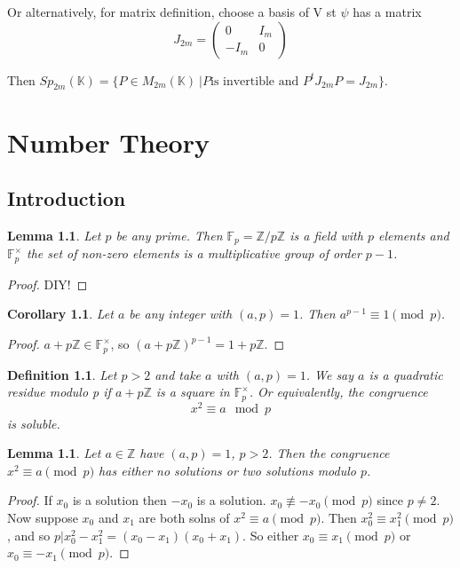 \documentclass{notes}
\theoremstyle{plain}
\newtheorem{corollary}[theorem]{Corollary}
\newtheorem{definition}[theorem]{Definition}
\newtheorem{lemma}[theorem]{Lemma}
\newcommand{\nequiv}{\not \equiv}
\begin{document}
Or alternatively, for matrix definition, choose a basis of V st $\psi$
has a matrix
\[J_{2m}=
\left(
\begin{matrix}
  0       & I_m \\
  -I_m & 0
\end{matrix}
\right)
\]

Then $Sp_{2m}(\mathbb{K}) = \{ P \in M_{2m}(\mathbb{K}) \: | P \text{
  is invertible and } P^tJ_{2m}P = J_{2m}\}$.

\chapter{Number Theory}

\section{Introduction}

\begin{lemma}
  Let $p$ be any prime.  Then $\mathbb{F}_p = \mathbb{Z}/p\mathbb{Z}$
  is a field with $p$ elements and $\mathbb{F}_p^{\times}$ the set of
  non-zero elements is a multiplicative group of order $p-1$.
\end{lemma}

\begin{proof}
  DIY!
\end{proof}

\begin{corollary}
  Let $a$ be any integer with $(a,p)=1$. Then $a^{p-1}\equiv 1
  \pmod{p}$.
\end{corollary}

\begin{proof}
  $a+p\mathbb{Z} \in \mathbb{F}_p^{\times}$, so
  $(a+p\mathbb{Z})^{p-1}=1+p\mathbb{Z}$.
\end{proof}

\begin{definition}
  Let $p>2$ and take $a$ with $(a,p)=1$.  We say $a$ is a quadratic
  residue modulo p if $a+p\mathbb{Z}$ is a square in
  $\mathbb{F}_p^{\times}$.  Or equivalently, the congruence
\[
x^2 \equiv a \mod{p}
\]
is soluble.
\end{definition}

\begin{lemma}
  Let $a \in \mathbb{Z}$ have $(a,p)=1$, $p>2$.  Then the congruence
  $x^2 \equiv a \pmod{p}$ has either no solutions or two solutions
  modulo $p$.
\end{lemma}

\begin{proof}
  If $x_0$ is a solution then $-x_0$ is a solution. $x_0 \nequiv -x_0
  \pmod{p}$ since $p \ne 2$.  Now suppose $x_0$ and $x_1$ are both
  solns of $x^2 \equiv a \pmod{p}$.  Then $x_0^2 \equiv x_1^2
  \pmod{p}$, and so $p|x_0^2 - x_1^2 = (x_0-x_1)(x_0+x_1)$.  So either
  $x_0 \equiv x_1 \pmod p$ or $x_0 \equiv -x_1 \pmod{p}$.
\end{proof}
\end{document}
